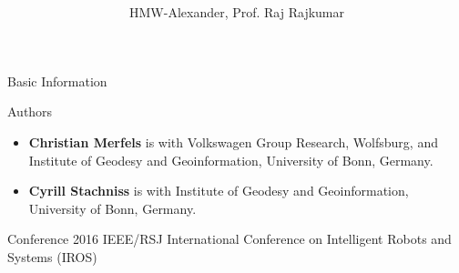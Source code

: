 \documentclass[10pt]{beamer}
\title[(\pptShortTitle)]{\textbf{\pptTitle}}
\subtitle{\pptSubTitle}
\author{HMW-Alexander, Prof. Raj Rajkumar}
\institute{CMU-ECE}
\begin{document}
	\frame[plain]{\maketitle}
	\begin{frame}{Basic Information}
		\begin{block}{Authors}
			\begin{itemize}
				\item \textbf{Christian Merfels} is with Volkswagen Group Research, Wolfsburg, and Institute of Geodesy and Geoinformation, University of Bonn, Germany.
				\item \textbf{Cyrill Stachniss} is with Institute of Geodesy and Geoinformation, University of Bonn, Germany.
			\end{itemize}
		\end{block}
		\begin{block}{Conference}
			2016 IEEE/RSJ International Conference on Intelligent Robots and Systems (IROS)
		\end{block}
	\end{frame}
\end{document}
